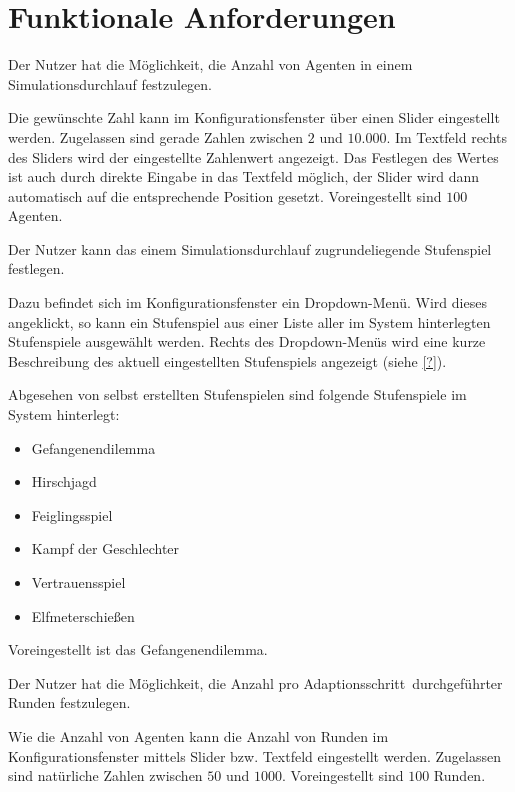 \documentclass[parskip=full,11pt]{scrartcl}
\def\adapt{Adaptionsschritt}
\begin{document}
\section{Funktionale Anforderungen}

Der Nutzer hat die Möglichkeit, die Anzahl von Agenten in einem Simulationsdurchlauf festzulegen.

Die gewünschte Zahl kann im Konfigurationsfenster über einen Slider eingestellt werden. Zugelassen sind gerade Zahlen zwischen \(2\) und \(10.000\). Im Textfeld rechts des Sliders wird der eingestellte Zahlenwert angezeigt. Das Festlegen des Wertes ist auch durch direkte Eingabe in das Textfeld möglich, der Slider wird dann automatisch auf die entsprechende Position gesetzt. Voreingestellt sind \(100\) Agenten.

Der Nutzer kann das einem Simulationsdurchlauf zugrundeliegende Stufenspiel festlegen.

Dazu befindet sich im Konfigurationsfenster ein Dropdown-Menü. Wird dieses angeklickt, so kann ein Stufenspiel aus einer Liste aller im System hinterlegten Stufenspiele ausgewählt werden. Rechts des Dropdown-Menüs wird eine kurze Beschreibung des aktuell eingestellten Stufenspiels angezeigt (siehe \cref{?}).

Abgesehen von selbst erstellten Stufenspielen sind folgende Stufenspiele im System hinterlegt:
\begin{itemize} \itemsep -10pt
\item Gefangenendilemma
\item Hirschjagd
\item Feiglingsspiel
\item Kampf der Geschlechter
\item Vertrauensspiel
\item Elfmeterschießen
\end{itemize}
Voreingestellt ist das Gefangenendilemma.

Der Nutzer hat die Möglichkeit, die Anzahl pro \adapt\ durchgeführter Runden festzulegen.

Wie die Anzahl von Agenten kann die Anzahl von Runden im Konfigurationsfenster mittels Slider bzw. Textfeld eingestellt werden. Zugelassen sind natürliche Zahlen zwischen \(50\) und \(1000\). Voreingestellt sind \(100\) Runden.
\end{document}
